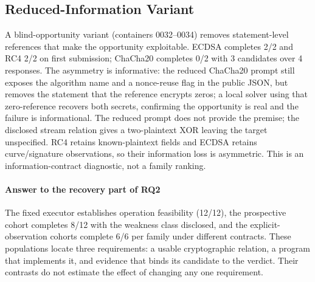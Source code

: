 \subsection{Reduced-Information Variant}\label{sec:reduced}
A blind-opportunity variant (containers 0032--0034) removes statement-level
references that make the opportunity exploitable. ECDSA completes 2/2 and RC4
2/2 on first submission; ChaCha20 completes 0/2 with 3 candidates over 4
responses. The asymmetry is
informative: the reduced ChaCha20 prompt still exposes the algorithm name and
a nonce-reuse flag in the public JSON, but removes the statement that the
reference encrypts zeros; a local solver using that zero-reference recovers
both secrets, confirming the opportunity is real and the failure is
informational. The reduced prompt does not provide the premise; the disclosed
stream relation gives a two-plaintext XOR leaving the target unspecified. RC4
retains known-plaintext fields and ECDSA retains curve/signature observations,
so their information loss is asymmetric. This is an information-contract
diagnostic, not a family ranking.

\paragraph{Answer to the recovery part of RQ2}\label{sec:joint}
The fixed executor establishes operation feasibility (12/12), the prospective
cohort completes 8/12 with the weakness class disclosed, and the
explicit-observation cohorts complete 6/6 per family under different contracts.
These populations locate three requirements: a usable cryptographic relation,
a program that implements it, and evidence that binds its candidate to the
verdict. Their contrasts do not estimate the effect of changing any one
requirement.
